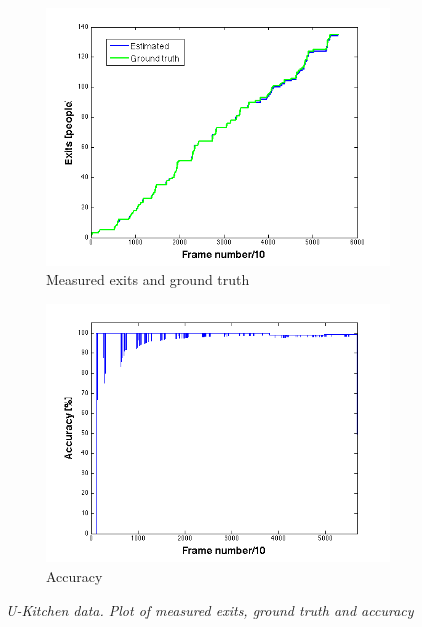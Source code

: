 \begin{figure}[h]
\centering
\begin{subfigure}{.5\textwidth}
  \centering
  \includegraphics[width=1.1\linewidth]{images/exitsGTU.png}
  \caption{Measured exits and ground truth}
  \label{fig:sub1}
\end{subfigure}%
\begin{subfigure}{.5\textwidth}
  \centering
  \includegraphics[width=1.1\linewidth]{images/accOutU.png}
  \caption{Accuracy}
  \label{fig:sub2}
\end{subfigure}
\caption[U-kitchen exits]{\textit{U-Kitchen data. Plot of measured exits, ground truth and accuracy}}
\label{fig:U-kitchen exits}
\end{figure}
\newpage

